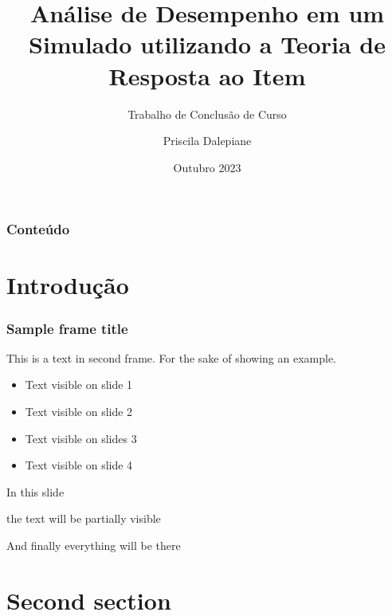 \documentclass{beamer}
\title[TRI] %
{Análise de Desempenho em um Simulado utilizando a Teoria de Resposta ao Item}
\subtitle{Trabalho de Conclusão de Curso}
\author[Priscila] %
{Priscila Dalepiane}
\institute[UFMT] %
{
	
	Bacharelado em estatística\\
	Universidade Federal de Mato Grosso

}
\date[2023] %
{Outubro 2023}
\begin{document}
	
	\frame{\titlepage}
	
	

	\begin{frame}
		\frametitle{Conteúdo}
		\tableofcontents
	\end{frame}

	
	
	\section{Introdução}
	

	\begin{frame}
		\frametitle{Sample frame title}
		This is a text in second frame. For the sake of showing an example.
		
		\begin{itemize}
			\item<1-> Text visible on slide 1
			\item<2-> Text visible on slide 2
			\item<3> Text visible on slides 3
			\item<4-> Text visible on slide 4
		\end{itemize}
	\end{frame}
	
	
	
	\begin{frame}
		In this slide \pause
		
		the text will be partially visible \pause
		
		And finally everything will be there
	\end{frame}
	
	\section{Second section}
	
\end{document}
